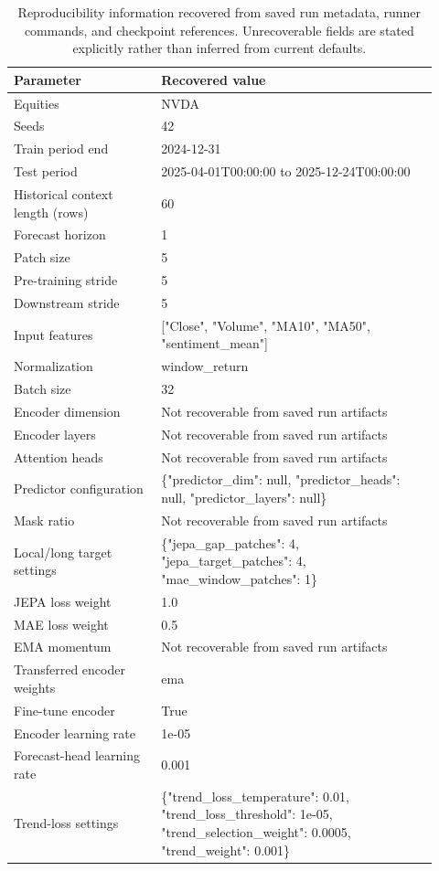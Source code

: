 \begin{table}[p]
\centering
\small
\caption{Reproducibility information recovered from saved run metadata, runner commands, and checkpoint references. Unrecoverable fields are stated explicitly rather than inferred from current defaults.}
\label{tab:reproducibility}
\begin{tabular}{p{0.32\linewidth}p{0.60\linewidth}}
\toprule
Parameter & Recovered value \\
\midrule
Equities & NVDA \\
Seeds & 42 \\
Train period end & 2024-12-31 \\
Test period & 2025-04-01T00:00:00 to 2025-12-24T00:00:00 \\
Historical context length (rows) & 60 \\
Forecast horizon & 1 \\
Patch size & 5 \\
Pre-training stride & 5 \\
Downstream stride & 5 \\
Input features & ["Close", "Volume", "MA10", "MA50", "sentiment\_mean"] \\
Normalization & window\_return \\
Batch size & 32 \\
Encoder dimension & Not recoverable from saved run artifacts \\
Encoder layers & Not recoverable from saved run artifacts \\
Attention heads & Not recoverable from saved run artifacts \\
Predictor configuration & \{"predictor\_dim": null, "predictor\_heads": null, "predictor\_layers": null\} \\
Mask ratio & Not recoverable from saved run artifacts \\
Local/long target settings & \{"jepa\_gap\_patches": 4, "jepa\_target\_patches": 4, "mae\_window\_patches": 1\} \\
JEPA loss weight & 1.0 \\
MAE loss weight & 0.5 \\
EMA momentum & Not recoverable from saved run artifacts \\
Transferred encoder weights & ema \\
Fine-tune encoder & True \\
Encoder learning rate & 1e-05 \\
Forecast-head learning rate & 0.001 \\
Trend-loss settings & \{"trend\_loss\_temperature": 0.01, "trend\_loss\_threshold": 1e-05, "trend\_selection\_weight": 0.0005, "trend\_weight": 0.001\} \\

\end{tabular}
\end{table}

